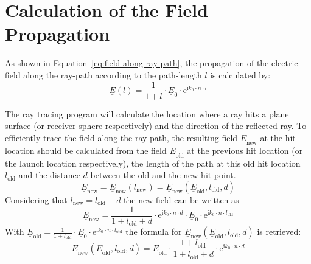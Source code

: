 \section{Calculation of the Field Propagation}\label{section:calculation_of_the_field_propagation}
As shown in Equation~\eqref{eq:field-along-ray-path}, the propagation of the electric field along the ray-path according to the path-length \(l\) is calculated by:
\begin{equation}
    \underline{E}(l) = \frac{1}{1 + l} \cdot \underline{E}_0 \cdot \mathrm{e}^{\mathrm{i} k_0 \cdot n \cdot l}
\end{equation} 

The ray tracing program will calculate the location where a ray hits a plane surface (or receiver sphere respectively) and the direction of the reflected ray.
To efficiently trace the field along the ray-path, the resulting field \(\underline{E}_{\text{new}}\) at the hit location should be calculated from the field \(\underline{E}_{\text{old}}\) at the previous hit location (or the launch location respectively), the length of the path at this old hit location \(l_{\text{old}}\) and the distance \(d\) between the old and the new hit point.
\begin{equation}
    \underline{E}_{\text{new}} = \underline{E}_{\text{new}}(l_{\text{new}}) = \underline{E}_{\text{new}}(\underline{E}_{\text{old}}, l_{\text{old}}, d)
\end{equation}
Considering that \(l_{\text{new}} = l_{\text{old}} + d\) the new field can be written as
\begin{equation}
    \underline{E}_{\text{new}} = \frac{1}{1 + l_{\text{old}} + d} \cdot \mathrm{e}^{\mathrm{i} k_0 \cdot n \cdot d}  \cdot \underline{E}_{0} \cdot \mathrm{e}^{\mathrm{i} k_0 \cdot n \cdot l_{\text{old}}} 
\end{equation}
With \(\underline{E}_{\text{old}} = \frac{1}{1 + l_{\text{old}}} \cdot \underline{E}_0 \cdot \mathrm{e}^{\mathrm{i} k_0 \cdot n \cdot l_{\text{old}}} \) the formula for \(\underline{E}_{\text{new}}(\underline{E}_{\text{old}}, l_{\text{old}}, d)\) is retrieved:
\begin{equation}
    \underline{E}_{\text{new}}(\underline{E}_{\text{old}}, l_{\text{old}}, d) = \underline{E}_{\text{old}} \cdot \frac{1 + l_{\text{old}}}{1 + l_{\text{old}} + d} \cdot \mathrm{e}^{\mathrm{i} k_0 \cdot n \cdot d}
\end{equation}

